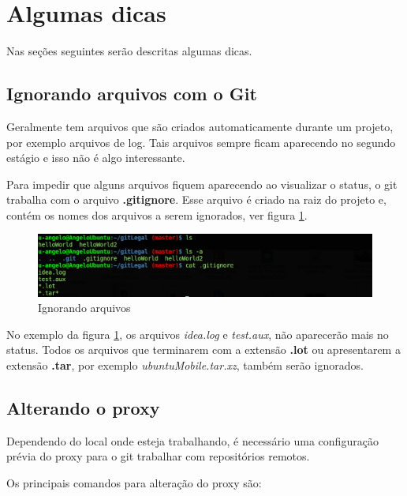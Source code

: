 \documentclass[12pt,openright,oneside,a4paper,english,brazil]{abntex2}
\begin{document}
\section{Algumas dicas}

Nas seções seguintes serão descritas algumas dicas.

\subsection{Ignorando arquivos com o Git}

Geralmente tem arquivos que são criados automaticamente durante um projeto, por exemplo arquivos de log. Tais arquivos sempre ficam aparecendo no segundo estágio e isso não é algo interessante. 

Para impedir que alguns arquivos fiquem aparecendo ao visualizar o status, o git trabalha com o arquivo \textbf{.gitignore}. Esse arquivo é criado na raiz do projeto e, contém os nomes dos arquivos a serem ignorados, ver figura \ref{gitignore}. 

\begin{figure}[h]
	\caption{\label{gitignore}Ignorando arquivos}
	\begin{center}
		\includegraphics[width=1\linewidth]{gitignore}
	\end{center}
\end{figure}

No exemplo da figura \ref{gitignore}, os arquivos \textit{idea.log} e \textit{test.aux}, não aparecerão mais no status. Todos os arquivos que terminarem com a extensão \textbf{.lot} ou apresentarem a extensão \textbf{.tar}, por exemplo \textit{ubuntuMobile.tar.xz}, também serão ignorados. 


\subsection{Alterando o proxy \label{alterandoproxy}}

Dependendo do local onde esteja trabalhando, é necessário uma configuração prévia do proxy para o git trabalhar com repositórios remotos. 

Os principais comandos para alteração do proxy são:
\end{document}
